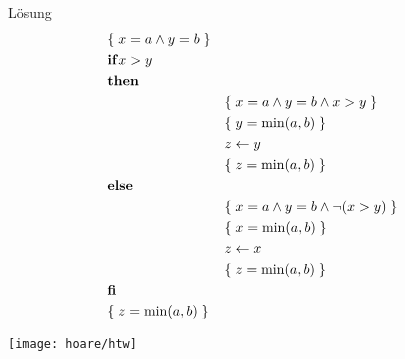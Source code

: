 \begin{frame}{Lösung}	
	\vspace{-15mm}
	\begin{alignat*}{2}
	&\{\;x=a \land y=b\;\}  \\
	&\mathbf{if } x>y  \\
	&\mathbf{then } \\
	&&&\{\;x=a \land y=b \land x>y\;\} \\
	&&&\{\;y=\min(a,b)\;\} \\
	&&& z \gets y  \\
	&&&\{\;z=\min(a,b)\;\} \\
	&\mathbf{else } \\
	&&&\{\;x=a \land y=b \land  \lnot (x>y)\;\} \\
	&&&\{\;x=\min(a,b)\;\} \\
	&&& z \gets x  \\
	&&&\{\;z=\min(a,b)\;\} \\
	&\mathbf{fi } \\
	&\{\;z=\min(a,b)\;\}
	\end{alignat*}
\end{frame}



\begin{frame}
	\texttt{[image: hoare/htw]}
\end{frame}

